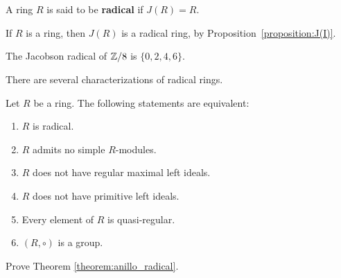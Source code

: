 \section{}

\begin{definition}
A ring $R$ is said to be \textbf{radical} if $J(R)=R$. 
\end{definition}

\begin{example}
	If $R$ is a ring, then $J(R)$ is a radical ring, by Proposition~\ref{proposition:J(I)}.
\end{example}

\begin{example}
	The Jacobson radical of $\mathbb{Z}/8$ is $\{0,2,4,6\}$. 
\end{example}

There are several characterizations of radical rings. 

\begin{theorem}
	\label{theorem:anillo_radical}
	Let $R$ be a ring. The following statements are equivalent: 
	\begin{enumerate}
		\item $R$ is radical.
		\item $R$ admits no simple $R$-modules. 
		\item $R$ does not have regular maximal left ideals.
		\item $R$ does not have primitive left ideals.
		\item Every element of $R$ is quasi-regular. 
		\item $(R,\circ)$ is a group. 
	\end{enumerate}
\end{theorem}

\begin{exercise}
    Prove Theorem \ref{theorem:anillo_radical}. 
\end{exercise}
%    
%
%	
%	
%

